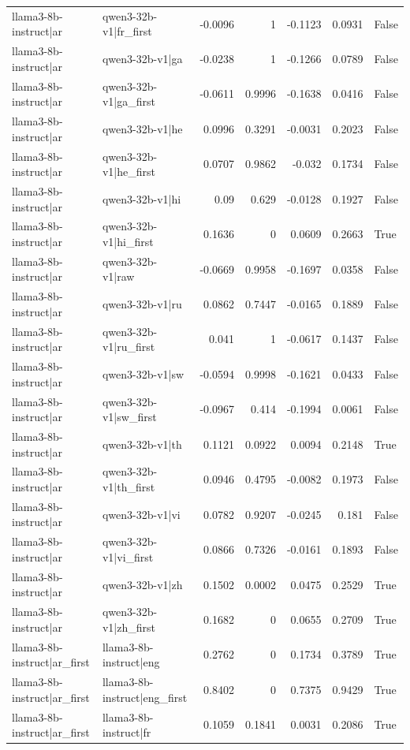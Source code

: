 \begin{table}
\begin{tabular}{l l r r r r l}
llama3-8b-instruct|ar & qwen3-32b-v1|fr_first & -0.0096 & 1 & -0.1123 & 0.0931 & False \\
llama3-8b-instruct|ar & qwen3-32b-v1|ga & -0.0238 & 1 & -0.1266 & 0.0789 & False \\
llama3-8b-instruct|ar & qwen3-32b-v1|ga_first & -0.0611 & 0.9996 & -0.1638 & 0.0416 & False \\
llama3-8b-instruct|ar & qwen3-32b-v1|he & 0.0996 & 0.3291 & -0.0031 & 0.2023 & False \\
llama3-8b-instruct|ar & qwen3-32b-v1|he_first & 0.0707 & 0.9862 & -0.032 & 0.1734 & False \\
llama3-8b-instruct|ar & qwen3-32b-v1|hi & 0.09 & 0.629 & -0.0128 & 0.1927 & False \\
llama3-8b-instruct|ar & qwen3-32b-v1|hi_first & 0.1636 & 0 & 0.0609 & 0.2663 & True \\
llama3-8b-instruct|ar & qwen3-32b-v1|raw & -0.0669 & 0.9958 & -0.1697 & 0.0358 & False \\
llama3-8b-instruct|ar & qwen3-32b-v1|ru & 0.0862 & 0.7447 & -0.0165 & 0.1889 & False \\
llama3-8b-instruct|ar & qwen3-32b-v1|ru_first & 0.041 & 1 & -0.0617 & 0.1437 & False \\
llama3-8b-instruct|ar & qwen3-32b-v1|sw & -0.0594 & 0.9998 & -0.1621 & 0.0433 & False \\
llama3-8b-instruct|ar & qwen3-32b-v1|sw_first & -0.0967 & 0.414 & -0.1994 & 0.0061 & False \\
llama3-8b-instruct|ar & qwen3-32b-v1|th & 0.1121 & 0.0922 & 0.0094 & 0.2148 & True \\
llama3-8b-instruct|ar & qwen3-32b-v1|th_first & 0.0946 & 0.4795 & -0.0082 & 0.1973 & False \\
llama3-8b-instruct|ar & qwen3-32b-v1|vi & 0.0782 & 0.9207 & -0.0245 & 0.181 & False \\
llama3-8b-instruct|ar & qwen3-32b-v1|vi_first & 0.0866 & 0.7326 & -0.0161 & 0.1893 & False \\
llama3-8b-instruct|ar & qwen3-32b-v1|zh & 0.1502 & 0.0002 & 0.0475 & 0.2529 & True \\
llama3-8b-instruct|ar & qwen3-32b-v1|zh_first & 0.1682 & 0 & 0.0655 & 0.2709 & True \\
llama3-8b-instruct|ar_first & llama3-8b-instruct|eng & 0.2762 & 0 & 0.1734 & 0.3789 & True \\
llama3-8b-instruct|ar_first & llama3-8b-instruct|eng_first & 0.8402 & 0 & 0.7375 & 0.9429 & True \\
llama3-8b-instruct|ar_first & llama3-8b-instruct|fr & 0.1059 & 0.1841 & 0.0031 & 0.2086 & True \\

\end{tabular}
\end{table}
